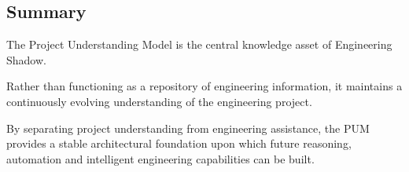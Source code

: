 
\subsection{Summary}

The Project Understanding Model is the central knowledge asset of Engineering Shadow.

Rather than functioning as a repository of engineering information, it maintains a continuously evolving understanding of the engineering project.

By separating project understanding from engineering assistance, the PUM provides a stable architectural foundation upon which future reasoning, automation and intelligent engineering capabilities can be built.